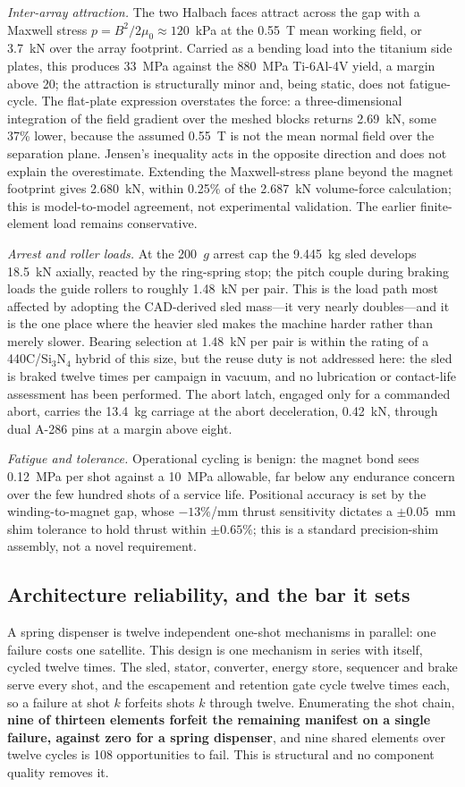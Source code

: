 \documentclass[conference]{IEEEtran}
\begin{document}
\emph{Inter-array attraction.} The two Halbach faces attract across the gap with a Maxwell stress $p=B^2/2\mu_0\approx120$~kPa at the 0.55~T mean working field, or 3.7~kN over the array footprint. Carried as a bending load into the titanium side plates, this produces 33~MPa against the 880~MPa Ti-6Al-4V yield, a margin above 20; the attraction is structurally minor and, being static, does not fatigue-cycle. The flat-plate expression overstates the force: a three-dimensional integration of the field gradient over the meshed blocks returns 2.69~kN, some 37\% lower, because the assumed 0.55~T is not the mean normal field over the separation plane. Jensen's inequality acts in the opposite direction and does not explain the overestimate. Extending the Maxwell-stress plane beyond the magnet footprint gives 2.680~kN, within 0.25\% of the 2.687~kN volume-force calculation; this is model-to-model agreement, not experimental validation. The earlier finite-element load remains conservative.

\emph{Arrest and roller loads.} At the 200~$g$ arrest cap the 9.445~kg sled develops 18.5~kN axially, reacted by the ring-spring stop; the pitch couple during braking loads the guide rollers to roughly 1.48~kN per pair. This is the load path most affected by adopting the CAD-derived sled mass---it very nearly doubles---and it is the one place where the heavier sled makes the machine harder rather than merely slower. Bearing selection at 1.48~kN per pair is within the rating of a 440C/Si$_3$N$_4$ hybrid of this size, but the reuse duty is not addressed here: the sled is braked twelve times per campaign in vacuum, and no lubrication or contact-life assessment has been performed. The abort latch, engaged only for a commanded abort, carries the 13.4~kg carriage at the abort deceleration, 0.42~kN, through dual A-286 pins at a margin above eight.

\emph{Fatigue and tolerance.} Operational cycling is benign: the magnet bond sees 0.12~MPa per shot against a 10~MPa allowable, far below any endurance concern over the few hundred shots of a service life. Positional accuracy is set by the winding-to-magnet gap, whose $-13\%$/mm thrust sensitivity dictates a $\pm0.05$~mm shim tolerance to hold thrust within $\pm0.65\%$; this is a standard precision-shim assembly, not a novel requirement.

\subsection{Architecture reliability, and the bar it sets}
A spring dispenser is twelve independent one-shot mechanisms in parallel: one failure costs one satellite. This design is one mechanism in series with itself, cycled twelve times. The sled, stator, converter, energy store, sequencer and brake serve every shot, and the escapement and retention gate cycle twelve times each, so a failure at shot $k$ forfeits shots $k$ through twelve. Enumerating the shot chain, \textbf{nine of thirteen elements forfeit the remaining manifest on a single failure, against zero for a spring dispenser}, and nine shared elements over twelve cycles is 108 opportunities to fail. This is structural and no component quality removes it.
\end{document}

